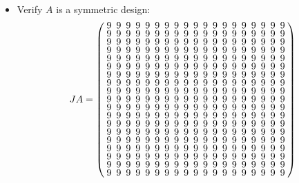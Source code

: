\documentclass{beamer}
\newcommand{\bibd}[1]{2 \mymin #1 \mymin design}
\begin{document}
\begin{frame}
  \begin{itemize}
  \item Verify $A$ is a symmetric design:
    \[
      JA =
      \arraycolsep=2.5pt\def\arraystretch{0.625}
      \left(
        \begin{array}{ccccccccccccccccccc}
          9&9&9&9&9&9&9&9&9&9&9&9&9&9&9&9&9&9&9\\
          9&9&9&9&9&9&9&9&9&9&9&9&9&9&9&9&9&9&9\\
          9&9&9&9&9&9&9&9&9&9&9&9&9&9&9&9&9&9&9\\
          9&9&9&9&9&9&9&9&9&9&9&9&9&9&9&9&9&9&9\\
          9&9&9&9&9&9&9&9&9&9&9&9&9&9&9&9&9&9&9\\
          9&9&9&9&9&9&9&9&9&9&9&9&9&9&9&9&9&9&9\\
          9&9&9&9&9&9&9&9&9&9&9&9&9&9&9&9&9&9&9\\
          9&9&9&9&9&9&9&9&9&9&9&9&9&9&9&9&9&9&9\\
          9&9&9&9&9&9&9&9&9&9&9&9&9&9&9&9&9&9&9\\
          9&9&9&9&9&9&9&9&9&9&9&9&9&9&9&9&9&9&9\\
          9&9&9&9&9&9&9&9&9&9&9&9&9&9&9&9&9&9&9\\
          9&9&9&9&9&9&9&9&9&9&9&9&9&9&9&9&9&9&9\\
          9&9&9&9&9&9&9&9&9&9&9&9&9&9&9&9&9&9&9\\
          9&9&9&9&9&9&9&9&9&9&9&9&9&9&9&9&9&9&9\\
          9&9&9&9&9&9&9&9&9&9&9&9&9&9&9&9&9&9&9\\
          9&9&9&9&9&9&9&9&9&9&9&9&9&9&9&9&9&9&9\\
          9&9&9&9&9&9&9&9&9&9&9&9&9&9&9&9&9&9&9\\
          9&9&9&9&9&9&9&9&9&9&9&9&9&9&9&9&9&9&9\\
          9&9&9&9&9&9&9&9&9&9&9&9&9&9&9&9&9&9&9\\
        \end{array}
      \right)
    \]
  \end{itemize}
\end{frame}


\end{document}
